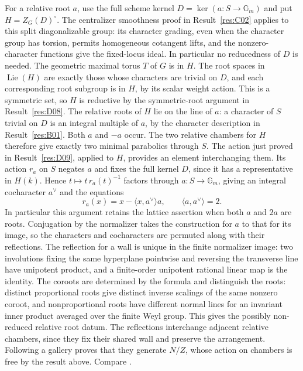 \documentclass[11pt,a4paper,openany,oneside]{book}
\theoremstyle{resultstyle}
\theoremstyle{definition}
\numberwithin{equation}{chapter}
\newcommand{\Gm}{\mathbb{G}_m}
\DeclareMathOperator{\Lie}{Lie}
\begin{document}
For a relative root \(a\), use the full scheme kernel
\(D=\ker(a:S\to\Gm)\) and put \(H=Z_G(D)^\circ\).
The centralizer smoothness proof in Result~\ref{res:C02}
applies to this split diagonalizable group: its
character grading, even when the character group has
torsion, permits homogeneous cotangent lifts, and the
nonzero-character functions give the fixed-locus ideal.
In particular no reducedness of \(D\) is needed.
The geometric maximal torus \(T\) of \(G\) is in \(H\).
The root spaces in \(\Lie(H)\) are exactly those whose
characters are trivial on \(D\), and each corresponding
root subgroup is in \(H\), by its scalar weight action.
This is a symmetric set, so \(H\) is reductive by the
symmetric-root argument in Result~\ref{res:D08}.
The relative roots of \(H\) lie on the line of \(a\):
a character of \(S\) trivial on \(D\) is an integral
multiple of \(a\), by the character description in
Result~\ref{res:B01}. Both \(a\) and \(-a\) occur.
The two relative chambers for \(H\) therefore give
exactly two minimal parabolics through \(S\).
The action just proved in Result~\ref{res:D09},
applied to \(H\), provides an element interchanging
them. Its action \(r_a\) on \(S\) negates \(a\) and
fixes the full kernel \(D\), since it has a representative
in \(H(k)\). Hence \(t\mapsto t\,r_a(t)^{-1}\)
factors through \(a:S\to\Gm\), giving an integral
cocharacter \(a^\vee\) and the equations
\[
 r_a(x)=x-\langle x,a^\vee\rangle a,\qquad
 \langle a,a^\vee\rangle=2 .
\]
In particular this argument retains the lattice assertion
when both \(a\) and \(2a\) are roots. Conjugation by the
normalizer takes the construction for \(a\) to that for
its image, so the characters and cocharacters are
permuted along with their reflections. The reflection for a
wall is unique in the finite normalizer image: two
involutions fixing the same hyperplane pointwise and
reversing the transverse line have unipotent product, and
a finite-order unipotent rational linear map is the identity.
The coroots are determined by the formula and distinguish
the roots: distinct proportional roots give distinct
inverse scalings of the same nonzero coroot, and
nonproportional roots have different normal lines for an
invariant inner product averaged over the finite Weyl group.
This gives the possibly non-reduced relative root datum.
The reflections interchange adjacent relative chambers, since
they fix their shared wall and preserve the arrangement.
Following a gallery proves that they generate \(N/Z\),
whose action on chambers is free by the result above.
Compare \cite[Sections 11.3--11.4]{conradfeng}.
\end{document}

